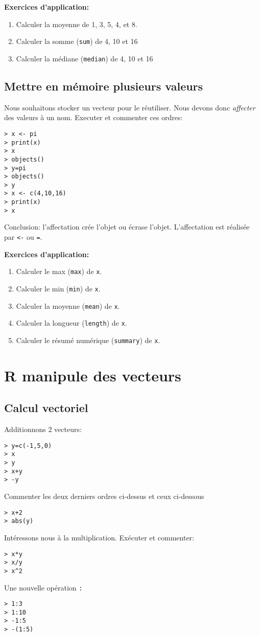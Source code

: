 \documentclass[a4paper,10pt,french]{article}
\begin{document}
\medskip
\textbf{Exercices d'application:}
\begin{enumerate}
\item Calculer la moyenne de 1, 3, 5, 4, et 8.
\item Calculer la somme (\texttt{sum}) de 4, 10 et 16
\item Calculer la médiane  (\texttt{median}) de 4, 10 et 16
\end{enumerate}

\subsection{Mettre en mémoire plusieurs valeurs}
Nous souhaitons stocker un vecteur pour le réutiliser. Nous devons donc \emph{affecter} des valeurs à un nom. Executer et commenter ces ordres:
\begin{verbatim}
> x <- pi
> print(x)
> x
> objects()
> y=pi
> objects()
> y
> x <- c(4,10,16) 
> print(x)
> x
\end{verbatim}
Conclusion: l'affectation crée l'objet ou écrase l'objet. L'affectation
est réalisée par \verb+<-+ ou \verb+=+.

\medskip
\textbf{Exercices d'application:}
\begin{enumerate}
\item Calculer le max (\texttt{max}) de \texttt{x}.
\item Calculer le min (\texttt{min}) de \texttt{x}.
\item Calculer la moyenne (\texttt{mean}) de \texttt{x}.
\item Calculer la longueur (\texttt{length}) de \texttt{x}.
\item Calculer le résumé  numérique (\texttt{summary}) de \texttt{x}.
\end{enumerate}

\section{\textsf{R} manipule des vecteurs}
\subsection{Calcul vectoriel}
Additionnons 2 vecteurs:
\begin{verbatim}
> y=c(-1,5,0)
> x
> y
> x+y
> -y
\end{verbatim}
Commenter les deux derniers ordres ci-dessus et ceux ci-dessous
\begin{verbatim}
> x+2
> abs(y)
\end{verbatim}
Intéressons nous à la multiplication. Exécuter et commenter:
\begin{verbatim}
> x*y
> x/y
> x^2
\end{verbatim}
Une nouvelle opération \verb+:+
\begin{verbatim}
> 1:3
> 1:10
> -1:5
> -(1:5)
\end{verbatim}
\end{document}
